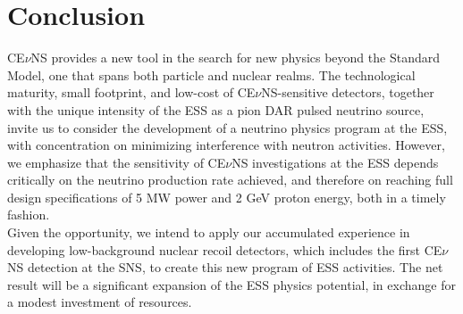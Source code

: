
\section{Conclusion}

CE$\nu$NS provides a new tool in the search for new physics beyond the Standard Model, one that spans both particle and nuclear realms. The technological maturity, small footprint, and low-cost of CE$\nu$NS-sensitive detectors, together with the unique intensity of the ESS as a pion DAR pulsed neutrino source, invite us to consider the development of a neutrino physics program at the ESS, with concentration on minimizing interference with neutron activities. However, we emphasize that the sensitivity of CE$\nu$NS investigations at the ESS depends critically on the neutrino production rate achieved, and therefore on reaching full design specifications of 5 MW power and 2 GeV proton energy, both in a timely fashion.\\

Given the opportunity, we intend to apply our accumulated experience in developing low-background nuclear recoil detectors, which includes the first CE$\nu$NS detection at the SNS, to create this new program of ESS activities. The net result will be a significant expansion of the ESS physics potential, in exchange for a modest investment of resources. 

%


%
%
%
%
%
%
